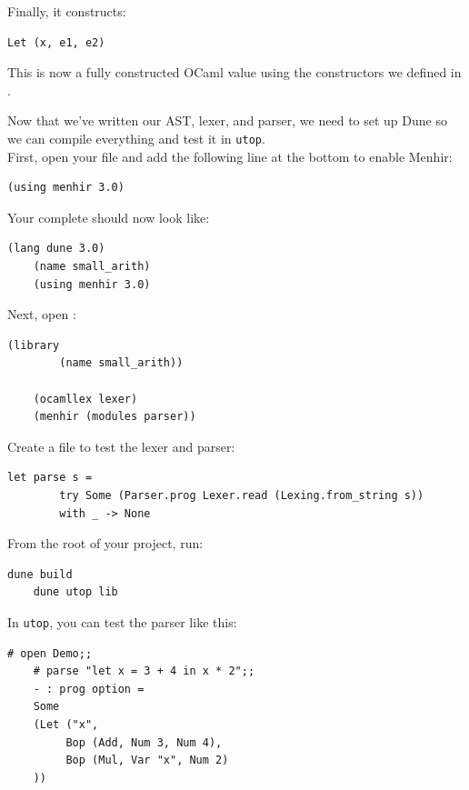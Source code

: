 \begin{Example}
    \noindent
    Finally, it constructs:
    
    \begin{lstlisting}[numbers=none]
    Let (x, e1, e2)
    \end{lstlisting}
    
    \noindent
    This is now a fully constructed OCaml value using the constructors we defined in .
    
    \end{Example}
            
    \newpage 

\begin{Example}

    Now that we've written our AST, lexer, and parser, we need to set up Dune so we can compile everything and test it in \texttt{utop}.\\
    
    \noindent
    First, open your  file and add the following line at the bottom to enable Menhir:
    
    \begin{lstlisting}[numbers=none]
    (using menhir 3.0)
    \end{lstlisting}
    
    \noindent
    Your complete  should now look like:
    
    \begin{lstlisting}[numbers=none]
    (lang dune 3.0)
    (name small_arith)
    (using menhir 3.0)
    \end{lstlisting}
    
    \noindent
    Next, open :
    
    \begin{lstlisting}[numbers=none]
    (library
        (name small_arith))
    
    (ocamllex lexer)
    (menhir (modules parser))
    \end{lstlisting}
    
    \noindent
    Create a  file to test the lexer and parser:
    \begin{lstlisting}[numbers=none]
    let parse s =
        try Some (Parser.prog Lexer.read (Lexing.from_string s))
        with _ -> None
    \end{lstlisting}
    
    \noindent
    From the root of your project, run:
    
    \begin{lstlisting}[numbers=none]
    dune build
    dune utop lib
    \end{lstlisting}
    
    \noindent
    In \texttt{utop}, you can test the parser like this:
    
    \begin{lstlisting}[numbers=none]
    # open Demo;;
    # parse "let x = 3 + 4 in x * 2";;
    - : prog option =
    Some
    (Let ("x",
         Bop (Add, Num 3, Num 4),
         Bop (Mul, Var "x", Num 2)
    ))
    \end{lstlisting}
    \end{Example}
        
        
